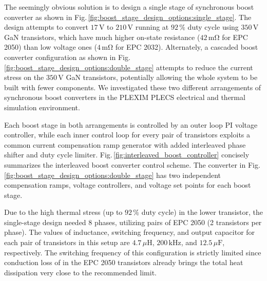     The seemingly obvious solution is to design a single stage of synchronous boost converter as shown in Fig.\,\ref{fig:boost_stage_design_options:single_stage}. The design attempts to convert $17\,\mathrm{V}$ to $210\,\mathrm{V}$ running at $92\,\%$ duty cycle using $350\,\mathrm{V}$ GaN transistors, which have much higher on-state resistance ($42\,\mathrm{m\Omega}$ for EPC 2050) than low voltage ones ($4\,\mathrm{m\Omega}$ for EPC 2032). Alternately, a cascaded boost converter \cite{Sosa2013} configuration as shown in Fig.\,\ref{fig:boost_stage_design_options:double_stage} attempts to reduce the current stress on the $350\,\mathrm{V}$ GaN transistors, potentially allowing the whole system to be built with fewer components. We investigated these two different arrangements of synchronous boost converters in the PLEXIM PLECS electrical and thermal simulation environment.
    
    
    Each boost stage in both arrangements is controlled by an outer loop PI voltage controller, while each inner control loop for every pair of transistors exploits a common current compensation ramp generator with added interleaved phase shifter and duty cycle limiter. Fig.\,\ref{fig:interleaved_boost_controller} concisely summarizes the interleaved boost converter control scheme. The converter in Fig.\,\ref{fig:boost_stage_design_options:double_stage} has two independent compensation ramps, voltage controllers, and voltage set points for each boost stage. 


    Due to the high thermal stress (up to $92\,\%$ duty cycle) in the lower transistor, the single-stage design needed $8$ phases, utilizing pairs of EPC 2050 (2 transistors per phase). The values of inductance, switching frequency, and output capacitor for each pair of transistors in this setup are $4.7\,\mu\mathrm{H}$, $200\,\mathrm{kHz}$, and $12.5\,\mu\mathrm{F}$, respectively. The switching frequency of this configuration is strictly limited since conduction loss of in the EPC 2050 transistors already brings the total heat dissipation very close to the recommended limit. 



